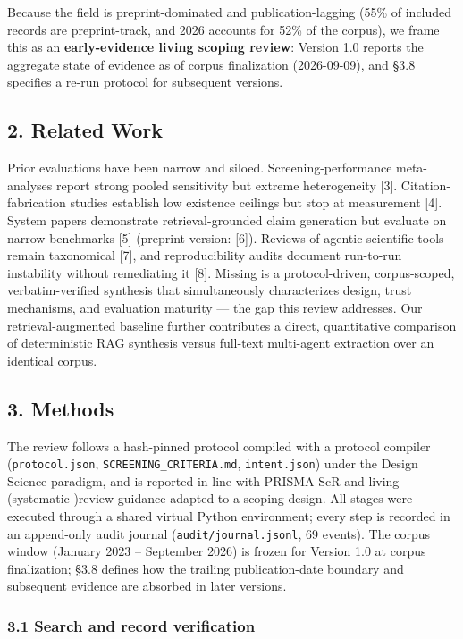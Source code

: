 \documentclass[11pt]{article}
\begin{document}
Because the field is preprint-dominated and publication-lagging (55\% of
included records are preprint-track, and 2026 accounts for 52\% of the
corpus), we frame this as an \textbf{early-evidence living scoping
review}: Version 1.0 reports the aggregate state of evidence as of
corpus finalization (2026-09-09), and §3.8 specifies a re-run protocol
for subsequent versions.

\subsection{2. Related Work}\label{related-work}

Prior evaluations have been narrow and siloed. Screening-performance
meta-analyses report strong pooled sensitivity but extreme heterogeneity
{[}3{]}. Citation-fabrication studies establish low existence ceilings
but stop at measurement {[}4{]}. System papers demonstrate
retrieval-grounded claim generation but evaluate on narrow benchmarks
{[}5{]} (preprint version: {[}6{]}). Reviews of agentic scientific tools
remain taxonomical {[}7{]}, and reproducibility audits document
run-to-run instability without remediating it {[}8{]}. Missing is a
protocol-driven, corpus-scoped, verbatim-verified synthesis that
simultaneously characterizes design, trust mechanisms, and evaluation
maturity --- the gap this review addresses. Our retrieval-augmented
baseline further contributes a direct, quantitative comparison of
deterministic RAG synthesis versus full-text multi-agent extraction over
an identical corpus.

\subsection{3. Methods}\label{methods}

The review follows a hash-pinned protocol compiled with a protocol
compiler (\texttt{protocol.json}, \texttt{SCREENING\_CRITERIA.md},
\texttt{intent.json}) under the Design Science paradigm, and is reported
in line with PRISMA-ScR and living-(systematic-)review guidance adapted
to a scoping design. All stages were executed through a shared virtual
Python environment; every step is recorded in an append-only audit
journal (\texttt{audit/journal.jsonl}, 69 events). The corpus window
(January 2023 -- September 2026) is frozen for Version 1.0 at corpus
finalization; §3.8 defines how the trailing publication-date boundary
and subsequent evidence are absorbed in later versions.

\subsubsection{3.1 Search and record
verification}\label{search-and-record-verification}
\end{document}
